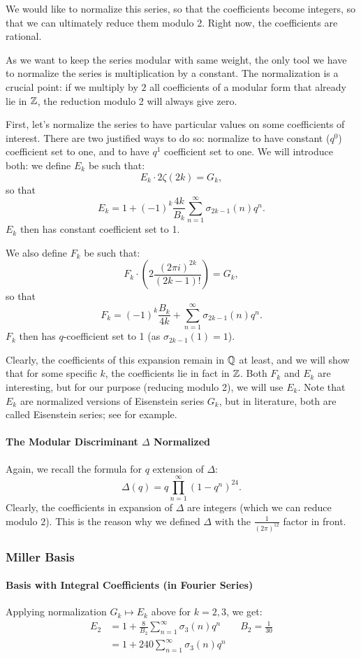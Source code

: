 We would like to normalize this series, so that the coefficients become integers, so that we can ultimately reduce them modulo 2.
Right now, the coefficients are rational.

As we want to keep the series modular with same weight, the only tool we have to normalize the series is multiplication by a constant.
The normalization is a crucial point: if we multiply by $2$ all coefficients of a modular form that already lie in $\mathbb{Z}$, the reduction modulo 2 will always give zero.

First, let's normalize the series to have particular values on some coefficients of interest.
There are two justified ways to do so: normalize to have constant ($q^0$) coefficient set to one, and to have $q^1$ coefficient set to one.
We will introduce both:
we define $E_k$ be such that:
$$
E_k \cdot 2\zeta(2k) = G_k,
$$
so that
$$
E_k = 1 + (-1)^k \frac{4k}{B_k} \sum_{n=1}^{\infty} \sigma_{2k-1}(n)q^n.
$$
$E_k$ then has constant coefficient set to 1.

We also define $F_k$ be such that:
$$
F_k \cdot \left( 2 \frac{{(2 \pi i)}^{2k}}{(2k-1)!} \right) = G_k,
$$
so that
$$
F_k =  (-1)^k \frac{B_k}{4k} + \sum_{n=1}^{\infty} \sigma_{2k-1}(n)q^n.
$$
$F_k$ then has $q$-coefficient set to 1 (as $\sigma_{2k-1}(1)=1$).

Clearly, the coefficients of this expansion remain in $\mathbb{Q}$ at least, and we will show that for some specific $k$, the coefficients lie in fact in $\mathbb{Z}$.
Both $F_k$ and $E_k$ are interesting, but for our purpose (reducing modulo 2), we will use $E_k$.
Note that $E_k$ are normalized versions of Eisenstein series $G_k$, but in literature, both are called Eisenstein series; see \cite[p.6]{IntoductionModularFormsWorkshop} for example.

\paragraph{The Modular Discriminant $\Delta$ Normalized}
Again, we recall the formula for $q$ extension of $\Delta$:
$$
\Delta(q) = q \prod_{n=1}^{\infty} (1-q^n)^{24}.
$$
Clearly, the coefficients in expansion of $\Delta$ are integers (which we can reduce modulo 2).
This is the reason why we defined $\Delta$ with the $\frac{1}{(2\pi)^{12}}$ factor in front.


\subsubsection{Miller Basis}
\paragraph{Basis with Integral Coefficients (in Fourier Series)}
Applying normalization $G_k \mapsto E_k$ above for $k=2,3$, we get:
\begin{align*}
	E_2 &= 1 + \frac{8}{B_2} \sum_{n=1}^{\infty} \sigma_{3}(n)q^n \qquad B_2 = \frac{1}{30} \\
	    &= 1 + 240 \sum_{n=1}^{\infty} \sigma_{3}(n)q^n
\end{align*}

